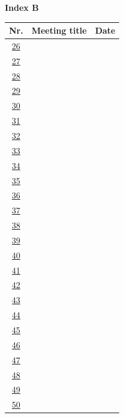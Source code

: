 \documentclass[aspectratio=43]{article}
\begin{document}
	\newpage
	

\hypertarget{indexB}{}

{\normalsize\textbf{Index B}}

\begin{center}
	\begin{scriptsize}
		
		\renewcommand{\arraystretch}{2.15}
		
		\begin{tabular}{c|p{}|p{}}
			\textbf{Nr.} & \textbf{Meeting title} & \textbf{Date} \\
			\hline
			\hyperlink{p26}{26} & & \\ \hline
			\hyperlink{p27}{27} & & \\ \hline
			\hyperlink{p28}{28} & & \\ \hline
			\hyperlink{p29}{29} & & \\ \hline
			\hyperlink{p30}{30} & & \\ \hline
			\hyperlink{p31}{31} & & \\ \hline
			\hyperlink{p32}{32} & & \\ \hline
			\hyperlink{p33}{33} & & \\ \hline
			\hyperlink{p34}{34} & & \\ \hline
			\hyperlink{p35}{35} & & \\ \hline
			\hyperlink{p36}{36} & & \\ \hline
			\hyperlink{p37}{37} & & \\ \hline
			\hyperlink{p38}{38} & & \\ \hline
			\hyperlink{p39}{39} & & \\ \hline
			\hyperlink{p40}{40} & & \\ \hline
			\hyperlink{p41}{41} & & \\ \hline
			\hyperlink{p42}{42} & & \\ \hline
			\hyperlink{p43}{43} & & \\ \hline
			\hyperlink{p44}{44} & & \\ \hline
			\hyperlink{p45}{45} & & \\ \hline
			\hyperlink{p46}{46} & & \\ \hline
			\hyperlink{p47}{47} & & \\ \hline
			\hyperlink{p48}{48} & & \\ \hline
			\hyperlink{p49}{49} & & \\ \hline
			\hyperlink{p50}{50} & & \\
		\end{tabular}
		
	\end{scriptsize}
\end{center}
\end{document}
